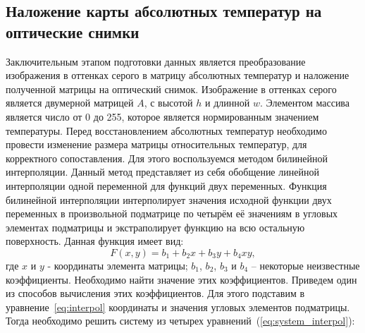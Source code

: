 \documentclass[14pt, a4paper]{extreport}
\begin{document}
\subsection[\vspace*{-0.22cm}Наложение карты абсолютных температур на оптические \\ \hspace*{-1.15cm}снимки]{\vspace*{-0.22cm}Наложение карты абсолютных температур на \\ \hspace*{-3.75cm}оптические снимки}	
	Заключительным этапом подготовки данных является преобразование изображения в оттенках серого в матрицу абсолютных температур и наложение полученной матрицы на оптический снимок. Изображение в оттенках серого является двумерной матрицей $A$, с высотой $h$ и длинной $w$. Элементом массива является число от 0 до 255, которое является нормированным значением температуры.
	Перед восстановлением абсолютных температур необходимо провести изменение размера матрицы относительных температур, для корректного сопоставления. Для этого воспользуемся методом билинейной интерполяции. Данный метод представляет из себя обобщение линейной интерполяции одной переменной для функций двух переменных. Функция билинейной интерполяции интерполирует значения исходной функции двух переменных в произвольной подматрице по четырём её значениям в угловых элементах подматрицы и экстраполирует функцию на всю остальную поверхность. Данная функция имеет вид: 
	\begin{equation}
		F(x,y)=b_{1}+b_{2} x+b_{3} y+b_{4} x y,
		\label{eq:interpol}
	\end{equation}
	где $x$ и $y$ - координаты элемента матрицы; $b_1$, $b_2$, $b_3$ и $b_4$ -- некоторые неизвестные коэффициенты. Необходимо найти значение этих коэффициентов. Приведем один из способов вычисления этих коэффициентов. Для этого подставим в уравнение~\ref{eq:interpol} координаты и значения угловых 
	элементов подматрицы. Тогда необходимо решить систему из четырех уравнений~(\ref{eq:system_interpol}):
	
\end{document}
